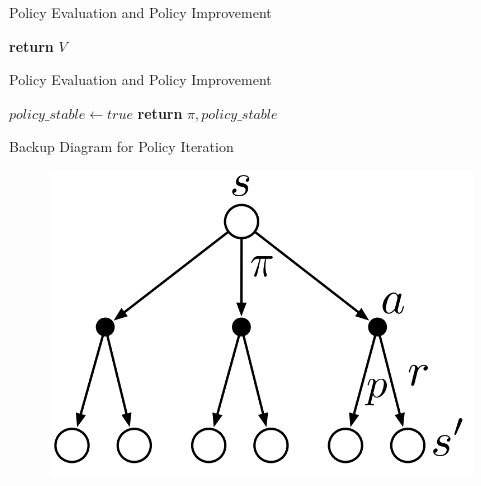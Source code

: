 \begin{frame}{Policy Evaluation and Policy Improvement}{}
	\begin{algorithm}[H]
		\footnotesize
		\DontPrintSemicolon
		\vspace*{1mm}
		\textbf{return} $V$
 			\caption{Policy Evaluation}
	\end{algorithm}
\end{frame}


\begin{frame}{Policy Evaluation and Policy Improvement}{}
	\begin{algorithm}[H]
		\footnotesize
		\DontPrintSemicolon
		\vspace*{1mm}
		$policy\_stable \longleftarrow true$\;
		\textbf{return} $\pi, policy\_stable$
 			\caption{Policy Improvement}
	\end{algorithm}
\end{frame}


\begin{frame}{Backup Diagram for Policy Iteration}{}
	\begin{figure}
		\centering
		\includegraphics[scale=0.375]{14_rl/02_img/backup_diagram_policy_iteration}
	\end{figure}
\end{frame}


